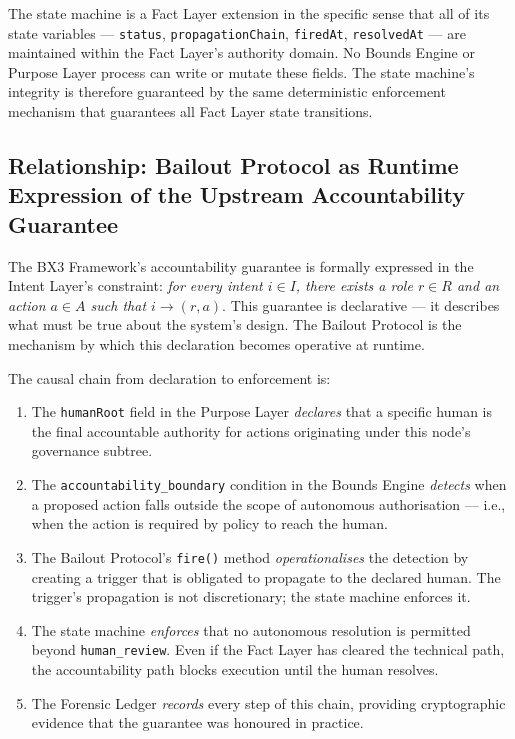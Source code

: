 The state machine is a Fact Layer extension in the specific sense that all of its
state variables --- \texttt{status}, \texttt{propagationChain}, \texttt{firedAt},
\texttt{resolvedAt} --- are maintained within the Fact Layer's authority domain.
No Bounds Engine or Purpose Layer process can write or mutate these fields.
The state machine's integrity is therefore guaranteed by the same deterministic
enforcement mechanism that guarantees all Fact Layer state transitions.

\subsection{Relationship: Bailout Protocol as Runtime Expression of
            the Upstream Accountability Guarantee}

The BX3 Framework's accountability guarantee is formally expressed in the Intent
Layer's constraint: \emph{for every intent $i \in I$, there exists a role $r \in R$
and an action $a \in A$ such that $i \rightarrow (r, a)$}.  This guarantee is
declarative --- it describes what must be true about the system's design.  The Bailout
Protocol is the mechanism by which this declaration becomes operative at runtime.

The causal chain from declaration to enforcement is:

\begin{enumerate}
  \item The \texttt{humanRoot} field in the Purpose Layer \emph{declares} that a
        specific human is the final accountable authority for actions originating
        under this node's governance subtree.
  \item The \texttt{accountability\_boundary} condition in the Bounds Engine
        \emph{detects} when a proposed action falls outside the scope of autonomous
        authorisation --- i.e., when the action is required by policy to reach the human.
  \item The Bailout Protocol's \texttt{fire()} method \emph{operationalises} the
        detection by creating a trigger that is obligated to propagate to the
        declared human.  The trigger's propagation is not discretionary; the state
        machine enforces it.
  \item The state machine \emph{enforces} that no autonomous resolution is
        permitted beyond \texttt{human\_review}.  Even if the Fact Layer has cleared
        the technical path, the accountability path blocks execution until the human
        resolves.
  \item The Forensic Ledger \emph{records} every step of this chain, providing
        cryptographic evidence that the guarantee was honoured in practice.
\end{enumerate}

